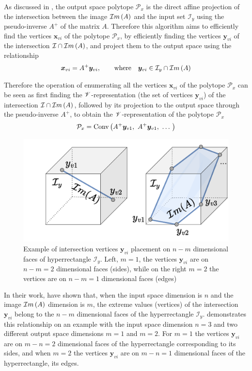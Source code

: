 As discussed in , the output space polytope $\mathcal{P}_x$ is the direct affine projection of the intersection between the image $\mathcal{I}m\left(A\right)$ and the input set $\mathcal{I}_y$ using the pseudo-inverse $A^+$ of the matrix $A$. Therefore this algorithm aims to efficiently find the vertices $\bm{x}_{vi}$ of the polytope $\mathcal{P}_x$, by efficiently finding the vertices $\bm{y}_{vi}$ of the intersection $\mathcal{I}\cap \mathcal{I}m\left(A\right)$, and project them to the output space using the relationship
\begin{equation}
    \bm{x}_{vi} = A^{+}\bm{y}_{vi}, \qquad \text{where} \quad \bm{y}_{vi}\in\mathcal{I}_y\cap \mathcal{I}m\left(A\right) \label{eq:compute_vert}
\end{equation}

Therefore the operation of enumerating all the vertices $\bm{x}_{vi}$ of the polytope $\mathcal{P}_x$ can be seen as first finding the $\mathscr{V}$-representation (the set of vertices $\bm{y}_{vi}$) of the intersection  $\mathcal{I}\cap \mathcal{I}m\left(A\right)$, followed by its projection to the output space through the pseudo-inverse $A^+$, to obtain the $\mathscr{V}$-representation of the polytope $\mathcal{P}_x$
\begin{equation}
    \mathcal{P}_x = \text{Conv}\left(A^+\bm{y}_{v1},~A^+\bm{y}_{v1},~\ldots~ \right)
\end{equation}

\begin{figure}
\vspace{-0.5cm}
    \centering
    \includegraphics[width=\linewidth]{Papers/images/intersetcion_size.pdf}
    \caption{Example of intersection vertices $\bm{y}_{vi}$ placement on $n\!-\!m$ dimensional faces of hyperrectangle $\mathcal{I}_y$. Left, $m=1$, the vertices $\bm{y}_{vi}$ are on $n\!-\!m\!=\!2$ dimensional faces (sides), while on the right $m=2$ the vertices are on $n\!-\!m\!=\!1$ dimensional faces (edges) }
    \label{fig:size_inter}
\end{figure}
In their work, \citet{sasaki2011vertex} have shown that, when the input space dimension is $n$ and the image $\mathcal{I}m\left(A\right)$ dimension is $m$, the extreme values (vertices) of the intersection $\bm{y}_{vi}$ belong to the $n-  m$ dimensional faces of the hyperrectangle $\mathcal{I}_y$.  demonstrates this relationship on an example with the input space dimension $n=3$ and two different output space dimensions $m=1$ and $m=2$. For $m=1$ the vertices $\bm{y}_{vi}$ are on $m-n=2$ dimensional faces of the hyperrectangle corresponding to its sides, and when $m=2$ the vertices  $\bm{y}_{vi}$ are on $m-n=1$ dimensional faces of the hyperrectangle, its edges.

